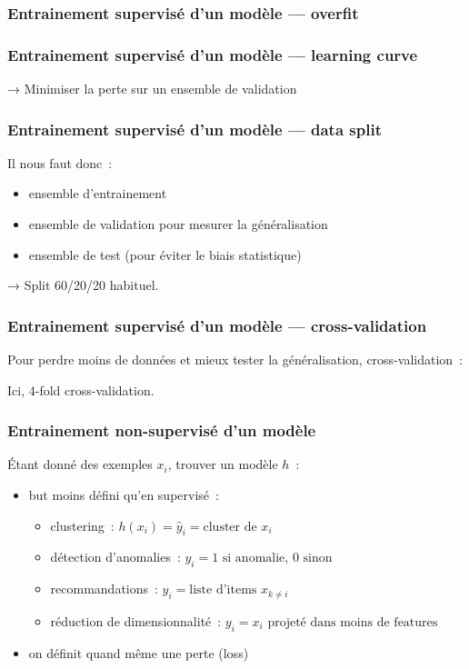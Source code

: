 \documentclass{formation}
\begin{document}
\begin{frame}
  \frametitle{Entrainement supervisé d'un modèle — overfit}


\end{frame}

\begin{frame}
  \frametitle{Entrainement supervisé d'un modèle — learning curve}


  → Minimiser la perte sur un ensemble de validation
\end{frame}

\begin{frame}
  \frametitle{Entrainement supervisé d'un modèle — data split}

  Il nous faut donc :

  \begin{itemize}
  \item ensemble d'entrainement
  \item ensemble de validation pour mesurer la généralisation
  \item ensemble de test (pour éviter le biais statistique)
  \end{itemize}

  → Split 60/20/20 habituel.
\end{frame}

\begin{frame}
  \frametitle{Entrainement supervisé d'un modèle — cross-validation}

  Pour \og perdre\fg{} moins de données et mieux tester la
  généralisation, cross-validation :


  Ici, 4-fold cross-validation.
\end{frame}

\begin{frame}
  \frametitle{Entrainement non-supervisé d'un modèle}
  Étant donné des exemples $x_i$, trouver un modèle $h$ :
  \begin{itemize}[<+->]
  \item but moins défini qu'en supervisé :
    \begin{itemize}[<+->]
    \item clustering : $h(x_i) = \hat{y}_i = \text{cluster de }x_i$
    \item détection d'anomalies : $y_i = 1 \text{ si anomalie, }0
      \text{ sinon}$
    \item recommandations : $y_i = \text{liste d'items }x_{k\neq i}$
    \item réduction de dimensionnalité : $y_i = x_i \text{ projeté dans
      moins de features}$
    \end{itemize}
  \item on définit quand même une perte (loss) \\[.2cm]
    \\[.2cm]
  \end{itemize}
\end{frame}
\end{document}
